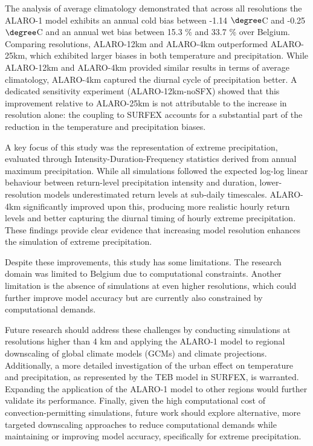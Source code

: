 \documentclass[journal abbreviation, manuscript]{copernicus}
\begin{document}
The analysis of average climatology demonstrated that across all resolutions the ALARO-1 model exhibits an annual cold bias between -1.14 $\degree$C and -0.25 $\degree$C and an annual wet bias between 15.3 \% and 33.7 \% over Belgium.
Comparing resolutions, ALARO-12km and ALARO-4km outperformed ALARO-25km, which exhibited larger biases in both temperature and precipitation.
While ALARO-12km and ALARO-4km provided similar results in terms of average climatology, ALARO-4km captured the diurnal cycle of precipitation better.
A dedicated sensitivity experiment (ALARO-12km-noSFX) showed that this improvement relative to ALARO-25km is not attributable to the increase in resolution alone: the coupling to SURFEX accounts for a substantial part of the reduction in the temperature and precipitation biases.

A key focus of this study was the representation of extreme precipitation, evaluated through Intensity-Duration-Frequency statistics derived from annual maximum precipitation.
While all simulations followed the expected log-log linear behaviour between return-level precipitation intensity and duration, lower-resolution models underestimated return levels at sub-daily timescales.
ALARO-4km significantly improved upon this, producing more realistic hourly return levels and better capturing the diurnal timing of hourly extreme precipitation.
These findings provide clear evidence that increasing model resolution enhances the simulation of extreme precipitation.

Despite these improvements, this study has some limitations. 
The research domain was limited to Belgium due to computational constraints.
Another limitation is the absence of simulations at even higher resolutions, which could further improve model accuracy but are currently also constrained by computational demands.

Future research should address these challenges by conducting simulations at resolutions higher than 4 km and applying the ALARO-1 model to regional downscaling of global climate models (GCMs) and climate projections.
Additionally, a more detailed investigation of the urban effect on temperature and precipitation, as represented by the TEB model in SURFEX, is warranted.
Expanding the application of the ALARO-1 model to other regions would further validate its performance.
Finally, given the high computational cost of convection-permitting simulations, future work should explore alternative, more targeted downscaling approaches to reduce computational demands while maintaining or improving model accuracy, specifically for extreme precipitation.
\end{document}
